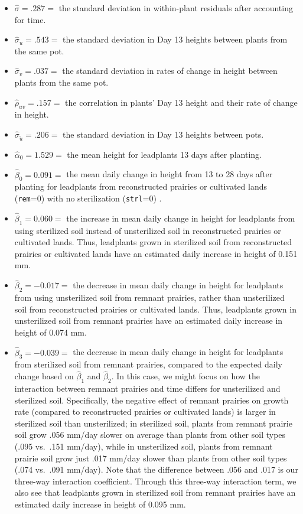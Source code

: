 \documentclass[
]{krantz}
\providecommand{\tightlist}{%
  \setlength{\itemsep}{0pt}\setlength{\parskip}{0pt}}
\begin{document}
\begin{itemize}
\tightlist
\item
  \(\hat{\sigma}=.287=\) the standard deviation in within-plant residuals after accounting for time.
\item
  \(\hat{\sigma}_{u}=.543=\) the standard deviation in Day 13 heights between plants from the same pot.
\item
  \(\hat{\sigma}_{v}=.037=\) the standard deviation in rates of change in height between plants from the same pot.
\item
  \(\hat{\rho}_{uv}=.157=\) the correlation in plants' Day 13 height and their rate of change in height.
\item
  \(\hat{\sigma}_{\tilde{u}}=.206=\) the standard deviation in Day 13 heights between pots.
\item
  \(\hat{\alpha}_{0}=1.529=\) the mean height for leadplants 13 days after planting.
\item
  \(\hat{\beta}_{0}=0.091=\) the mean daily change in height from 13 to 28 days after planting for leadplants from reconstructed prairies or cultivated lands (\texttt{rem}=0) with no sterilization (\texttt{strl}=0) .
\item
  \(\hat{\beta}_{1}=0.060=\) the increase in mean daily change in height for leadplants from using sterilized soil instead of unsterilized soil in reconstructed prairies or cultivated lands. Thus, leadplants grown in sterilized soil from reconstructed prairies or cultivated lands have an estimated daily increase in height of 0.151 mm.
\item
  \(\hat{\beta}_{2}=-0.017=\) the decrease in mean daily change in height for leadplants from using unsterilized soil from remnant prairies, rather than unsterilized soil from reconstructed prairies or cultivated lands. Thus, leadplants grown in unsterilized soil from remnant prairies have an estimated daily increase in height of 0.074 mm.
\item
  \(\hat{\beta}_{3}=-0.039=\) the decrease in mean daily change in height for leadplants from sterilized soil from remnant prairies, compared to the expected daily change based on \(\hat{\beta}_{1}\) and \(\hat{\beta}_{2}\). In this case, we might focus on how the interaction between remnant prairies and time differs for unsterilized and sterilized soil. Specifically, the negative effect of remnant prairies on growth rate (compared to reconstructed prairies or cultivated lands) is larger in sterilized soil than unsterilized; in sterilized soil, plants from remnant prairie soil grow .056 mm/day slower on average than plants from other soil types (.095 vs.~.151 mm/day), while in unsterilized soil, plants from remnant prairie soil grow just .017 mm/day slower than plants from other soil types (.074 vs.~.091 mm/day). Note that the difference between .056 and .017 is our three-way interaction coefficient. Through this three-way interaction term, we also see that leadplants grown in sterilized soil from remnant prairies have an estimated daily increase in height of 0.095 mm.
\end{itemize}
\end{document}
